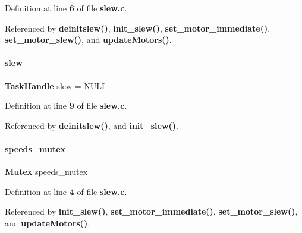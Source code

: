 Definition at line \textbf{ 6} of file \textbf{ slew.\+c}.



Referenced by \textbf{ deinitslew()}, \textbf{ init\+\_\+slew()}, \textbf{ set\+\_\+motor\+\_\+immediate()}, \textbf{ set\+\_\+motor\+\_\+slew()}, and \textbf{ update\+Motors()}.

\mbox{\label{slew_8c_a9dc30877eadbb32ceb6bede027c9a93f}} 
\paragraph{slew}
{\footnotesize\ttfamily \textbf{ Task\+Handle} slew = N\+U\+LL\hspace{0.3cm}{\ttfamily [static]}}



Definition at line \textbf{ 9} of file \textbf{ slew.\+c}.



Referenced by \textbf{ deinitslew()}, and \textbf{ init\+\_\+slew()}.

\mbox{\label{slew_8c_a29ddd4c66a52ff81b441d04f9f6d9318}} 
\paragraph{speeds\+\_\+mutex}
{\footnotesize\ttfamily \textbf{ Mutex} speeds\+\_\+mutex\hspace{0.3cm}{\ttfamily [static]}}



Definition at line \textbf{ 4} of file \textbf{ slew.\+c}.



Referenced by \textbf{ init\+\_\+slew()}, \textbf{ set\+\_\+motor\+\_\+immediate()}, \textbf{ set\+\_\+motor\+\_\+slew()}, and \textbf{ update\+Motors()}.


